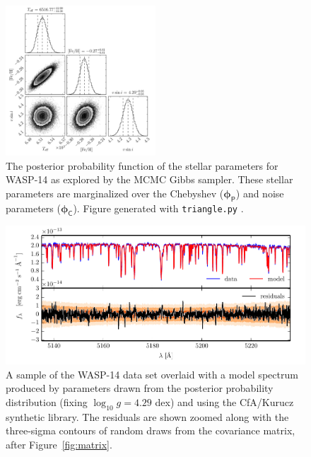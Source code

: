 \documentclass[iop,floatfix]{emulateapj}
\newcommand{\vp}{ {\bm \phi}}
\newcommand{\cheb}{ \vp_{\mathsf{P}}}
\newcommand{\cov}{ \vp_{\mathsf{C}}}
\begin{document}
\begin{figure}[!htb]
\begin{center}
  \includegraphics[width=0.5\textwidth]{figs/Kurucz_triangle.pdf}
  \caption{The posterior probability function of the stellar parameters for WASP-14 as explored by the MCMC Gibbs sampler. These stellar parameters are marginalized over the Chebyshev ($\cheb$) and noise parameters ($\cov$). Figure generated with \texttt{triangle.py} \citep{foreman-mackey14}.
}
\label{fig:Kurucz_posterior}
\end{center}
\end{figure}

\begin{figure}[!htb]
\begin{center}
\includegraphics{figs/residuals_Kurucz_logg.pdf}
\caption{A sample of the WASP-14 data set overlaid with a model spectrum produced by parameters drawn from the posterior probability distribution (fixing $\log_{10} g = 4.29$ dex) and using the {\sc CfA/Kurucz} synthetic library. The residuals are shown zoomed along with the three-sigma contours of random draws from the covariance matrix, after Figure~\ref{fig:matrix}.}
\label{fig:Kurucz_residuals}
\end{center}
\end{figure}
\end{document}
